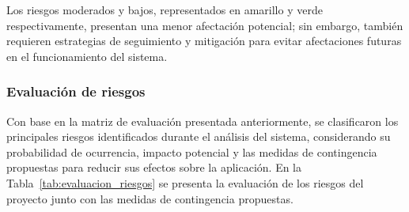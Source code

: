 Los riesgos moderados y bajos, representados en amarillo y verde respectivamente, presentan una menor afectación potencial; sin embargo, también requieren estrategias de seguimiento y mitigación para evitar afectaciones futuras en el funcionamiento del sistema.


\subsubsection{Evaluación de riesgos}

Con base en la matriz de evaluación presentada anteriormente, se clasificaron los principales riesgos identificados durante el análisis del sistema, considerando su probabilidad de ocurrencia, impacto potencial y las medidas de contingencia propuestas para reducir sus efectos sobre la aplicación.
En la Tabla~\ref{tab:evaluacion_riesgos} se presenta la evaluación de los riesgos del proyecto junto con las medidas de contingencia propuestas.

